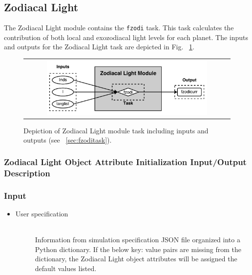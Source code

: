 \documentclass[cleanfoot]{asme2ej}
\begin{document}

\subsection{Zodiacal Light}\label{sec:zodiacallight}

The Zodiacal Light module contains the \verb+fzodi+ task.  This task calculates the contribution of both local and exozodiacal light levels for each planet.  The inputs and outputs for the Zodiacal Light task are depicted in Fig. ~\ref{fig:zodiacallightmodule}.

\begin{figure}[ht]
    \begin{center}
        \begin{tabular}{c}
             \includegraphics[width=0.8\textwidth]{ZodiTasks}
        \end{tabular}
    \end{center}
    \caption{\label{fig:zodiacallightmodule} Depiction of Zodiacal Light module task including inputs and outputs (see ~\ref{sec:fzoditask}).}
\end{figure}

\subsubsection{Zodiacal Light Object Attribute Initialization Input/Output Description}
\subsubsection*{Input}
\begin{itemize}
    \item
    \begin{description}
        \item[User specification] \hfill \\
        Information from simulation specification JSON file organized into a Python dictionary. If the below key: value pairs are missing from the dictionary, the Zodiacal Light object attributes will be assigned the default values listed.
    \end{description}
\end{itemize}
\end{document}
